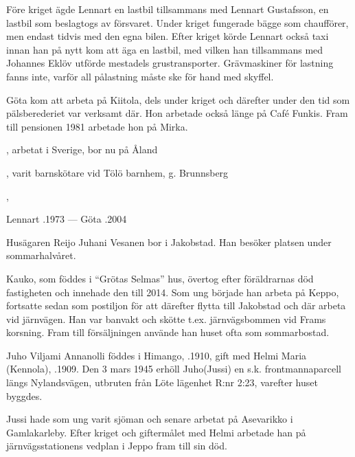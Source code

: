Före kriget ägde Lennart en lastbil tillsammans med Lennart Gustafsson, en lastbil som beslagtogs av försvaret. Under kriget fungerade bägge som chaufförer, men endast tidvis med den egna bilen. Efter kriget körde Lennart också taxi innan han på nytt kom att äga en lastbil, med vilken han tillsammans med Johannes Eklöv utförde mestadels grustransporter. Grävmaskiner för lastning fanns inte, varför all pålastning måste ske för hand med skyffel.

Göta kom att arbeta på Kiitola, dels under kriget och därefter under den tid som pälsberederiet var verksamt där. Hon arbetade också länge på Café Funkis. Fram till pensionen 1981 arbetade hon på Mirka.
\begin{jhchildren}
  \item {}, arbetat i Sverige, bor nu på Åland
  \item {}, varit barnskötare vid Tölö barnhem, g. Brunnsberg
  \item {},
\end{jhchildren}

Lennart .1973  ---  Göta .2004





Husägaren Reijo Juhani Vesanen bor i Jakobstad. Han besöker platsen under sommarhalvåret.\jhvspace{}


Kauko, som föddes i ``Grötas Selmas'' hus, övertog efter föräldrarnas död fastigheten och innehade den till 2014. Som ung började han arbeta på Keppo, fortsatte sedan som postiljon för att därefter flytta till Jakobstad och där arbeta vid järnvägen. Han var banvakt och skötte t.ex. järnvägsbommen vid Frams korsning. Fram till försäljningen använde han huset ofta som sommarbostad.


Juho Viljami Annanolli föddes i Himango, .1910, gift med Helmi Maria (Kennola), .1909. Den 3 mars 1945 erhöll Juho(Jussi) en s.k. frontmannaparcell längs Nylandsvägen, utbruten från Löte lägenhet R:nr 2:23, varefter huset byggdes.

Jussi hade som ung varit sjöman och senare arbetat på Asevarikko i Gamlakarleby. Efter kriget och giftermålet med Helmi arbetade han på järnvägsstationens vedplan i Jeppo fram till sin död.
\begin{jhchildren}
  \item {}
  \item {}
\end{jhchildren}

